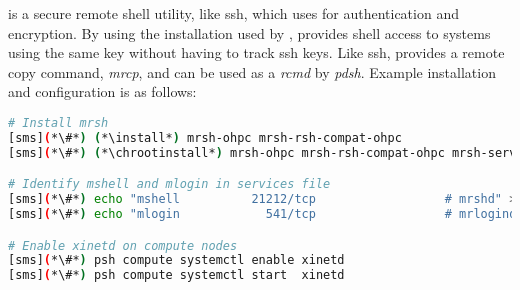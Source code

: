 \mrsh{} is a secure remote shell utility, like ssh, which uses \MUNGE{}
for authentication and encryption. By using the \MUNGE{} installation used by
\SLURM{}, \mrsh{} provides shell access to systems using the same \MUNGE{} key
without having to track {ssh} keys. Like {ssh}, \mrsh{} provides a
remote copy command, {\em mrcp}, and can be used as a {\em rcmd} by {\em
pdsh}. Example installation and configuration is as follows:

\begin{lstlisting}[language=bash,keywords={},upquote=true]
# Install mrsh
[sms](*\#*) (*\install*) mrsh-ohpc mrsh-rsh-compat-ohpc
[sms](*\#*) (*\chrootinstall*) mrsh-ohpc mrsh-rsh-compat-ohpc mrsh-server-ohpc

# Identify mshell and mlogin in services file
[sms](*\#*) echo "mshell          21212/tcp                  # mrshd" >> /etc/services
[sms](*\#*) echo "mlogin            541/tcp                  # mrlogind" >> /etc/services

# Enable xinetd on compute nodes
[sms](*\#*) psh compute systemctl enable xinetd
[sms](*\#*) psh compute systemctl start  xinetd
\end{lstlisting}


